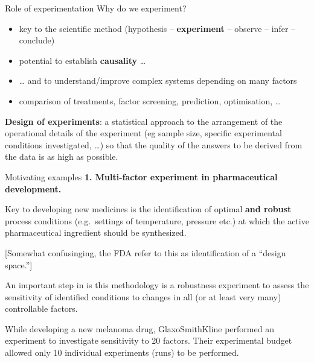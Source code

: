 \documentclass[
  ignorenonframetext,
]{beamer}
\begin{document}
\begin{frame}{Role of experimentation}
\protect\hypertarget{role-of-experimentation}{}
Why do we experiment?

\begin{itemize}
\item
  key to the scientific method (hypothesis -- \textbf{experiment} --
  observe -- infer -- conclude)
\item
  potential to establish \textbf{causality} \ldots{}
\item
  \ldots{} and to understand/improve complex systems depending on many
  factors
\item
  comparison of treatments, factor screening, prediction, optimisation,
  \ldots{}
\end{itemize}

\textbf{Design of experiments}: a statistical approach to the
arrangement of the operational details of the experiment (eg sample
size, specific experimental conditions investigated, \ldots) so that the
quality of the answers to be derived from the data is as high as
possible.
\end{frame}

\begin{frame}{Motivating examples}
\protect\hypertarget{motivating-examples}{}
\textbf{1. Multi-factor experiment in pharmaceutical development.}

Key to developing new medicines is the identification of optimal
\textbf{and robust} process conditions (e.g.~settings of temperature,
pressure etc.) at which the active pharmaceutical ingredient should be
synthesized.

{[}Somewhat confusinging, the FDA refer to this as identification of a
``design space.''{]}

An important step in is this methodology is a robustness experiment to
assess the sensitivity of identified conditions to changes in all (or at
least very many) controllable factors.

While developing a new melanoma drug, GlaxoSmithKline performed an
experiment to investigate sensitivity to 20 factors. Their experimental
budget allowed only 10 individual experiments (runs) to be performed.
\end{frame}
\end{document}
